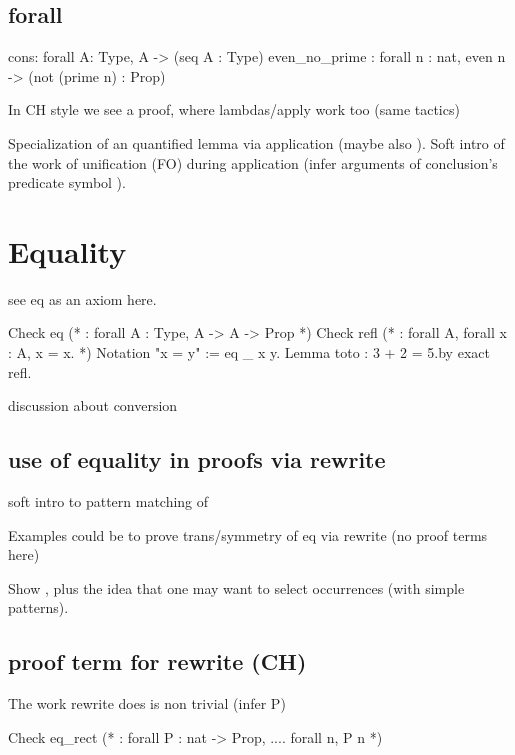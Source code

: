 \subsection{forall}

\begin{coq}{}
cons: forall A: Type, A -> (seq A : Type)
even_no_prime : forall n : nat, even n -> (not (prime n) : Prop)
\end{coq}

In CH style we see a proof, where lambdas/apply work too (same tactics)

Specialization of an quantified lemma via application (maybe also
).
Soft intro of the work of unification (FO) during application (infer
arguments of conclusion's predicate symbol ).

\section{Equality}

see eq as an axiom here.

\begin{coq}{}
Check eq  (* : forall A : Type, A -> A -> Prop *)
Check refl (* : forall A, forall x : A, x = x. *)
Notation "x = y" := eq _ x y.
Lemma toto : 3 + 2 = 5.by exact refl.
\end{coq}

discussion about conversion

\subsection{use of equality in proofs via rewrite}

soft intro to pattern matching of \C{(_ + _)}

Examples could be to prove trans/symmetry of eq via rewrite (no proof terms
here)

Show , plus the idea that one may want to select
occurrences (with simple patterns).

\subsection{proof term for rewrite (CH)}

The work rewrite does is non trivial (infer P)

\begin{coq}{}
Check eq_rect (* : forall P : nat -> Prop, .... forall n, P n *)
\end{coq}


